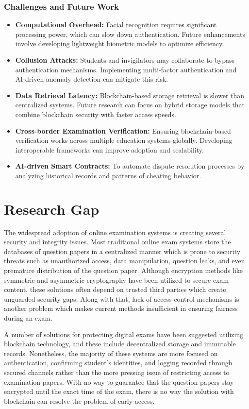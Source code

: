 \documentclass[12pt,a4paper]{article}
\begin{document}
\subsubsection{Challenges and Future Work}
\begin{itemize}
    \item \textbf{Computational Overhead:} Facial recognition requires significant processing power, which can slow down authentication. Future enhancements involve developing lightweight biometric models to optimize efficiency.
    \item \textbf{Collusion Attacks:} Students and invigilators may collaborate to bypass authentication mechanisms. Implementing multi-factor authentication and AI-driven anomaly detection can mitigate this risk.
    \item \textbf{Data Retrieval Latency:} Blockchain-based storage retrieval is slower than centralized systems. Future research can focus on hybrid storage models that combine blockchain security with faster access speeds.
    \item \textbf{Cross-border Examination Verification:} Ensuring blockchain-based verification works across multiple education systems globally. Developing interoperable frameworks can improve adoption and scalability.
    \item \textbf{AI-driven Smart Contracts:} To automate dispute resolution processes by analyzing historical records and patterns of cheating behavior.
\end{itemize}

\newpage
\section{Research Gap}
The widespread adoption of online examination systems is creating several security and integrity issues. Most traditional online exam systems store the databases of question papers in a centralized manner which is prone to security threats such as unauthorized access, data manipulation, question leaks, and even premature distribution of the question paper. Although encryption methods like symmetric and asymmetric cryptography have been utilized to secure exam content, these solutions often depend on trusted third parties which create unguarded security gaps. Along with that, lack of access control mechanisms is another problem which makes current methods insufficient in ensuring fairness during an exam.

A number of solutions for protecting digital exams have been suggested utilizing blockchain technology, and these include decentralized storage and immutable records. Nonetheless, the majority of these systems are more focused on authentication, confirming student's identities, and logging recorded through secured channels rather than the more pressing issue of restricting access to examination papers. With no way to guarantee that the question papers stay encrypted until the exact time of the exam, there is no way the solution with blockchain can resolve the problem of early access.
\end{document}
